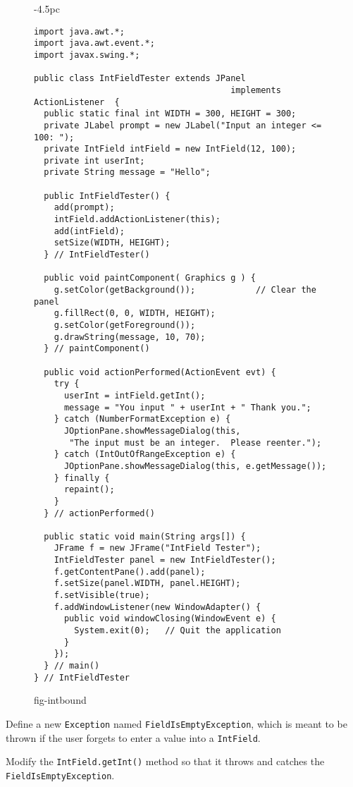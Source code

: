 \begin{figure}[p]
\jjjprogstart
\begin{jjjlistingleft}[30.5pc]{-4.5pc}
\begin{lstlisting}
import java.awt.*;
import java.awt.event.*;
import javax.swing.*;

public class IntFieldTester extends JPanel 
                                       implements ActionListener  {
  public static final int WIDTH = 300, HEIGHT = 300;
  private JLabel prompt = new JLabel("Input an integer <= 100: ");
  private IntField intField = new IntField(12, 100);
  private int userInt;
  private String message = "Hello";

  public IntFieldTester() {
    add(prompt);
    intField.addActionListener(this);
    add(intField);
    setSize(WIDTH, HEIGHT);
  } // IntFieldTester()

  public void paintComponent( Graphics g ) {
    g.setColor(getBackground());            // Clear the panel
    g.fillRect(0, 0, WIDTH, HEIGHT);
    g.setColor(getForeground());
    g.drawString(message, 10, 70);
  } // paintComponent()

  public void actionPerformed(ActionEvent evt) {
    try {
      userInt = intField.getInt();
      message = "You input " + userInt + " Thank you.";
    } catch (NumberFormatException e) {
      JOptionPane.showMessageDialog(this,
       "The input must be an integer.  Please reenter.");
    } catch (IntOutOfRangeException e) {
      JOptionPane.showMessageDialog(this, e.getMessage());
    } finally {
      repaint();
    }
  } // actionPerformed()

  public static void main(String args[]) {
    JFrame f = new JFrame("IntField Tester");
    IntFieldTester panel = new IntFieldTester();
    f.getContentPane().add(panel);
    f.setSize(panel.WIDTH, panel.HEIGHT);
    f.setVisible(true);
    f.addWindowListener(new WindowAdapter() { 
      public void windowClosing(WindowEvent e) {
        System.exit(0);   // Quit the application
      }
    });
  } // main()
} // IntFieldTester
\end{lstlisting}
\end{jjjlistingleft}
{fig-intbound}
\end{figure}

\begin{SSTUDY}

\item  Define a new {\tt Exception} named {\tt FieldIsEmpty\-Exception},
which is meant to be thrown if the user forgets to enter
a value into a {\tt IntField}.


\item  Modify the {\tt IntField.getInt()} method so that it throws and catches
the {\tt FieldIsEmptyException}.

\end{SSTUDY}

